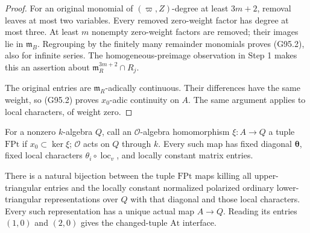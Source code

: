 \begin{proof}
For an original monomial of \((\varpi,Z)\)-degree at least
\(3m+2\), removal leaves at most two variables.
Every removed zero-weight factor has degree at most three.
At least \(m\) nonempty zero-weight factors are removed;
their images lie in \(\mathfrak m_B\).
Regrouping by the finitely many remainder monomials proves
(G95.2), also for infinite series.
The homogeneous-preimage observation in Step 1 makes this
an assertion about \(\mathfrak m_R^{3m+2}\cap R_j\).

The original entries are \(\mathfrak m_R\)-adically continuous.
Their differences have the same weight, so (G95.2) proves
\(x_0\)-adic continuity on \(A\).
The same argument applies to local characters, of weight zero.
\end{proof}

\begin{theorem}
\label{AC-G95-chart}
For a nonzero \(k\)-algebra \(Q\), call an
\(\mathcal O\)-algebra homomorphism \(\xi:A\to Q\) a tuple
\(\mathrm{FPt}\) if \(x_0\subset\ker\xi\);
\(\mathcal O\) acts on \(Q\) through \(k\).
Every such map has fixed diagonal \(\boldsymbol\theta\),
fixed local characters
\(\theta_i\circ\operatorname{loc}_v\), and locally constant
matrix entries.

There is a natural bijection between the tuple
\(\mathrm{FPt}\) maps killing all upper-triangular entries
and the locally constant normalized polarized ordinary
lower-triangular representations over \(Q\) with that
diagonal and those local characters.
Every such representation has a unique actual map \(A\to Q\).
Reading its entries \((1,0)\) and \((2,0)\) gives the
changed-tuple \(\mathrm{At}\) interface.
\end{theorem}


